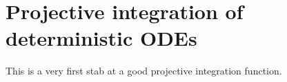 \section{Projective integration of deterministic ODEs}
\label{sec:ProjInt}

This is a very first stab at a good projective integration function.




